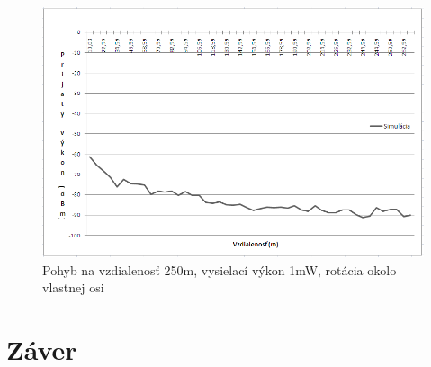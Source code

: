 \documentclass[11pt,twoside,a4paper]{book}
\begin{document}
\begin{figure}[htbp]
 \centering
 \includegraphics[width=13cm]{./figures/results/250-1mw-rotace.png}
 \caption{Pohyb na vzdialenosť 250m, vysielací výkon 1mW, rotácia okolo vlastnej osi}
 \label{fig:250m-1mW-rotace}
\end{figure}


\chapter{Záver}







%
{
\def\CS{$\cal C\kern-0.1667em\lower.5ex\hbox{$\cal S$}\kern-0.075em $}

}

%
\end{document}
